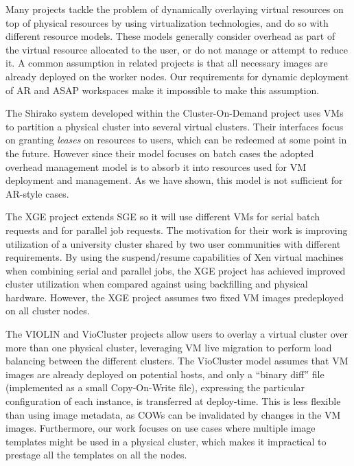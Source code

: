 Many projects tackle the problem of dynamically overlaying virtual
resources on top of physical resources by using virtualization
technologies, and do so with different resource models. These models
generally consider overhead as part of the virtual resource allocated
to the user, or do not manage or attempt to reduce it. A common
assumption in related projects is that all necessary images are already
deployed on the worker nodes. Our requirements for dynamic deployment
of AR and ASAP workspaces make it impossible to make this assumption.

The Shirako system \cite{BorjaCite12} developed within the Cluster{}-On{}-Demand
project \cite{BorjaCite10, codweb} uses VMs to partition a physical cluster into several
virtual clusters. Their interfaces focus on granting \emph{leases} on
resources to users, which can be redeemed at some point in the future.
However since their model focuses on batch cases the adopted overhead
management model is to absorb it into resources used for VM deployment
and management. As we have shown, this model is not sufficient for
AR{}-style cases.

The XGE project \cite{xge} extends SGE so it will use different VMs for serial batch requests and for parallel job requests. The motivation for their work is improving utilization of a university cluster shared by two user communities with different requirements. By using the suspend/resume capabilities of Xen virtual machines when combining serial and parallel jobs, the XGE project has achieved improved cluster utilization when compared against using backfilling and physical hardware. However, the XGE project assumes two fixed VM images predeployed on all cluster nodes.


The VIOLIN and VioCluster projects \cite{BorjaCite13, viocluster, DBLP:journals/computer/RuthJXG05} allow users to overlay a
virtual cluster over more than one physical cluster, leveraging VM live
migration to perform load balancing between the different clusters. The
VioCluster model assumes that VM images are already deployed on
potential hosts, and only a ``binary diff'' file (implemented as a
small Copy{}-On{}-Write file), expressing the particular configuration
of each instance, is transferred at deploy{}-time. This is less
flexible than using image metadata, as COWs can be invalidated by
changes in the VM images. Furthermore, our work focuses on use cases
where multiple image templates might be used in a physical cluster,
which makes it impractical to prestage all the templates on all the
nodes.

